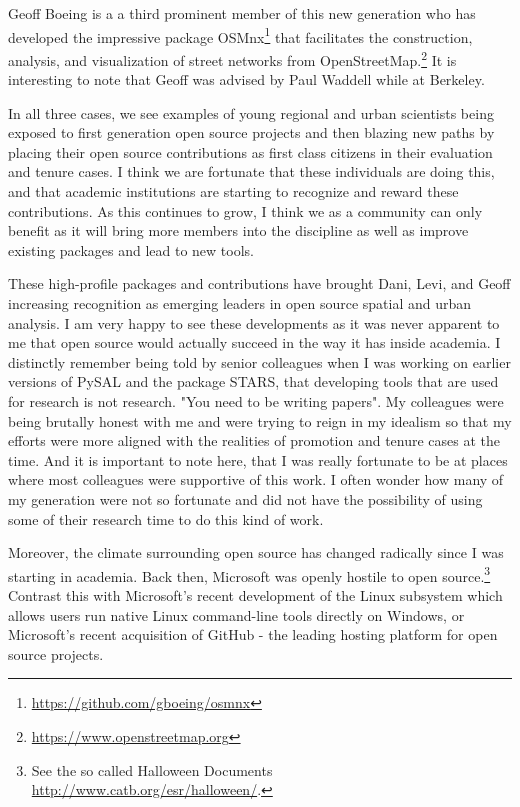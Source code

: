 \documentclass[11pt]{article}
\begin{document}
Geoff Boeing is a a third prominent member of this new generation who has
developed the impressive package OSMnx\footnote{\url{https://github.com/gboeing/osmnx}} that facilitates the
construction, analysis, and visualization of street networks from
OpenStreetMap.\footnote{\url{https://www.openstreetmap.org}} It is interesting to note that Geoff was advised by Paul
Waddell while at Berkeley.

In all three cases, we see examples of young regional and urban scientists
being exposed to first generation open source projects and then blazing new
paths by placing their open source contributions as first class citizens in
their evaluation and tenure cases. I think we are fortunate that these
individuals are doing this, and that academic institutions are starting to
recognize and reward these contributions. As this continues to grow, I think we
as a community can only benefit as it will bring more members into the
discipline as well as improve existing packages and lead to new tools.


These high-profile packages and contributions have brought Dani, Levi, and
Geoff increasing recognition as emerging leaders in open source spatial and
urban analysis. I am very happy to see these developments as it was never
apparent to me that open source would actually succeed in the way it has inside
academia. I distinctly remember being told by senior colleagues when I was
working on earlier versions of PySAL and the package STARS, that developing
tools that are used for research is not research. "You need to be writing
papers". My colleagues were being brutally honest with me and were trying to
reign in my idealism so that my efforts were more aligned with the realities of
promotion and tenure cases at the time. And it is important to note here, that
I was really fortunate to be at places where most colleagues were supportive of
this work. I often wonder how many of my generation were not so fortunate and
did not have the possibility of using some of their research time to do this
kind of work.

Moreover, the climate surrounding open source has changed  radically since I was
starting in academia. Back then, Microsoft was openly hostile to open
source.\footnote{See the so called Halloween Documents \url{http://www.catb.org/esr/halloween/}.} Contrast this with Microsoft's recent development of the
Linux subsystem which allows users run native Linux command-line tools directly
on Windows, or Microsoft's recent acquisition of GitHub - the leading
hosting platform for open source projects. 
\end{document}

